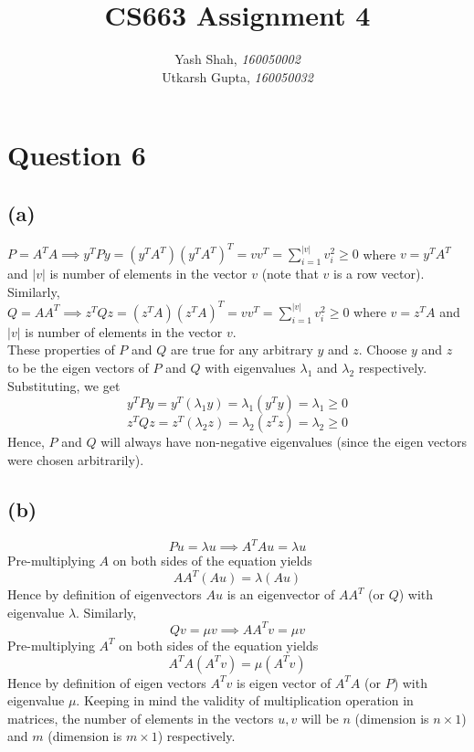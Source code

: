 \documentclass{article}
\title{CS663 Assignment 4}
\author{Yash Shah, \textit{160050002}\\Utkarsh Gupta, \textit{160050032}}
\begin{document}
\maketitle


\section*{Question 6}
\subsection*{(a)} 
$P = A^{T}A \implies y^TPy = (y^{T}A^{T})(y^{T}A^{T})^{T} = vv^{T} = \sum_{i=1}^{|v|} v_i^2 \geq 0$ where $v = y^{T}A^{T}$ and $|v|$ is number of elements in the vector $v$ (note that $v$ is a row vector).\\Similarly, \\ $Q = AA^{T} \implies z^TQz = (z^{T}A)(z^{T}A)^{T} = vv^{T} = \sum_{i=1}^{|v|} v_i^2 \geq 0$ where $v = z^{T}A$ and $|v|$ is number of elements in the vector $v$. \\
These properties of $P$ and $Q$ are true for any arbitrary $y$ and $z$. Choose $y$ and $z$ to be the eigen vectors of $P$ and $Q$ with eigenvalues $\lambda_1$ and $\lambda_2$ respectively. Substituting, we get\\
$$
y^TPy = y^T(\lambda_1 y) = \lambda_1(y^Ty) = \lambda_1 \geq 0 
$$ 
$$
z^TQz = z^T(\lambda_2 z) = \lambda_2(z^Tz) = \lambda_2 \geq 0 
$$
Hence, $P$ and $Q$ will always have non-negative eigenvalues (since the eigen vectors were chosen arbitrarily).
\subsection*{(b)} 
$$
Pu = \lambda u \implies A^{T}Au=\lambda u
$$
Pre-multiplying $A$ on both sides of the equation yields
$$
AA^{T}(Au) = \lambda(Au)
$$
Hence by definition of eigenvectors $Au$ is an eigenvector of $AA^T$ (or $Q$) with eigenvalue $\lambda$. Similarly,
$$
Qv = \mu v \implies AA^Tv=\mu v
$$
Pre-multiplying $A^T$ on both sides of the equation yields 
$$
A^{T}A(A^Tv) = \mu (A^Tv)
$$
Hence by definition of eigen vectors $A^Tv$ is eigen vector of $A^TA$ (or $P$) with eigenvalue $\mu$. Keeping in mind the validity of multiplication operation in matrices, the number of elements in the vectors $u,v$ will be $n$ (dimension is $n \times 1$) and $m$ (dimension is $m \times 1$) respectively.
\end{document}

